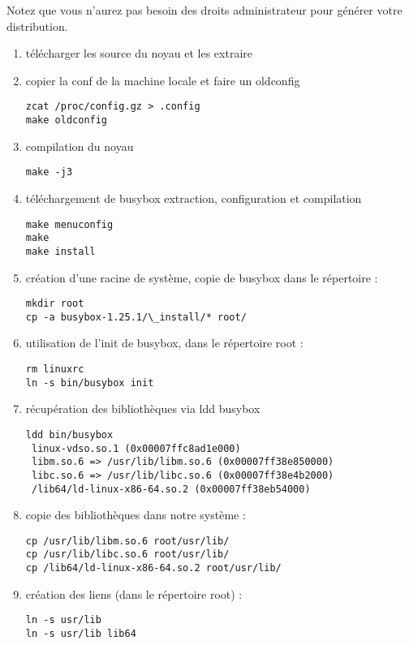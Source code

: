 \documentclass[11pt]{article}
\begin{document}
Notez que vous n'aurez pas besoin des droits administrateur pour générer votre distribution.

\begin{solution}

 \begin{enumerate}
  \item télécharger les source du noyau et les extraire
  \item copier la conf de la machine locale et faire un oldconfig
\begin{verbatim}
zcat /proc/config.gz > .config
make oldconfig
\end{verbatim}
  \item compilation du noyau 
\begin{verbatim}
make -j3
\end{verbatim}
  \item téléchargement de busybox extraction, configuration et compilation 
\begin{verbatim}
make menuconfig
make
make install
\end{verbatim}
  \item création d'une racine de système, copie de busybox dans le répertoire :
\begin{verbatim}
mkdir root
cp -a busybox-1.25.1/\_install/* root/
\end{verbatim}
  \item utilisation de l'init de busybox, dans le répertoire root : 
\begin{verbatim}
rm linuxrc
ln -s bin/busybox init
\end{verbatim}
  \item récupération des bibliothèques via ldd busybox
\begin{verbatim}
ldd bin/busybox
 linux-vdso.so.1 (0x00007ffc8ad1e000)
 libm.so.6 => /usr/lib/libm.so.6 (0x00007ff38e850000)
 libc.so.6 => /usr/lib/libc.so.6 (0x00007ff38e4b2000)
 /lib64/ld-linux-x86-64.so.2 (0x00007ff38eb54000)
\end{verbatim}
  \item copie des bibliothèques dans notre système :
\begin{verbatim}
cp /usr/lib/libm.so.6 root/usr/lib/
cp /usr/lib/libc.so.6 root/usr/lib/
cp /lib64/ld-linux-x86-64.so.2 root/usr/lib/
\end{verbatim}
  \item création des liens (dans le répertoire root) :
\begin{verbatim}
ln -s usr/lib
ln -s usr/lib lib64
\end{verbatim}

\end{enumerate}
\end{solution}
\end{document}
